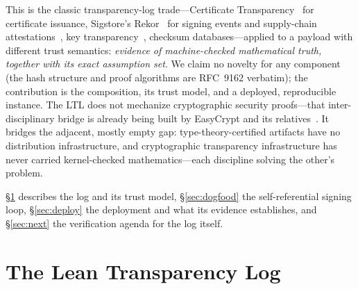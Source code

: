 \documentclass[10pt,twocolumn]{article}
\begin{document}
This is the classic transparency-log trade---Certificate
Transparency~\cite{rfc6962,rfc9162} for certificate issuance, Sigstore's
Rekor~\cite{sigstore} for signing events and supply-chain
attestations~\cite{intoto}, key transparency~\cite{coniks}, checksum
databases---applied to a payload with different trust semantics:
\emph{evidence of machine-checked mathematical truth, together with its
exact assumption set}. We claim no novelty for any component (the hash
structure and proof algorithms are RFC~9162 verbatim); the contribution
is the composition, its trust model, and a deployed, reproducible
instance. The LTL does not mechanize cryptographic security
proofs---that inter-disciplinary bridge is already being built by
EasyCrypt and its relatives~\cite{easycrypt}. It bridges the adjacent,
mostly empty gap: type-theory-certified artifacts have no distribution
infrastructure, and cryptographic transparency infrastructure has never
carried kernel-checked mathematics---each discipline solving the
other's problem.

\S\ref{sec:log} describes the log and its trust model,
\S\ref{sec:dogfood} the self-referential signing loop,
\S\ref{sec:deploy} the deployment and what its evidence establishes,
and \S\ref{sec:next} the verification agenda for the log itself.

\section{The Lean Transparency Log}
\label{sec:log}
\end{document}
